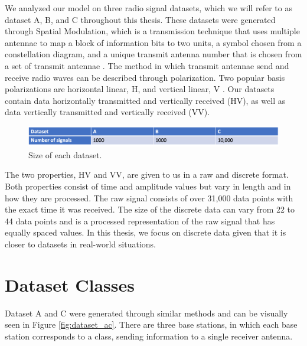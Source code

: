 \documentclass{turabian-thesis}[12pt]
\begin{document}
We analyzed our model on three radio signal datasets, which we will refer to as dataset A, B, and C throughout this thesis. These datasets were generated through Spatial Modulation, which is a transmission technique that uses multiple antennae to map a block of information bits to two units, a symbol chosen from a constellation diagram, and a unique transmit antenna number that is chosen from a set of transmit antennae \cite{mesleh_spatial_2008}. The method in which transmit antennae send and receive radio waves can be described through polarization. Two popular basis polarizations are horizontal linear, H, and vertical linear, V \cite{oshea_convolutional_2016}. Our datasets contain data horizontally transmitted and vertically received (HV), as well as data vertically transmitted and vertically received (VV).

\begin{figure}[h!]
   \begin{center}
      \includegraphics[scale=0.5]{../media/dataset_info.png}
   \end{center}
   \caption{Size of each dataset.}
   \label{fig:dataset_info}
\end{figure}

The two properties, HV and VV, are given to us in a raw and discrete format. Both properties consist of time and amplitude values but vary in length and in how they are processed. The raw signal consists of over 31,000 data points with the exact time it was received. The size of the discrete data can vary from 22 to 44 data points and is a processed representation of the raw signal that has equally spaced values. In this thesis, we focus on discrete data given that it is closer to datasets in real-world situations.

\section{Dataset Classes}

Dataset A and C were generated through similar methods and can be visually seen in Figure \ref{fig:dataset_ac}. There are three base stations, in which each base station corresponds to a class, sending information to a single receiver antenna.
\end{document}
